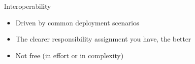 \documentclass[black,white,aspectratio=169]{beamer}
\DeclareRobustCommand{\#}{\adjustbox{valign=B,totalheight=.57\baselineskip}{\oldhash}}%
\newcommand\todo[1]{
    \textcolor{red}{#1}
}
\begin{document}
    \begin{frame}{Interoperability}
        \begin{itemize}
            \item Driven by common deployment scenarios~\medskip
            \item The clearer responsibility assignment you have, the better~\medskip
            \item Not free (in effort or in complexity)~\medskip
        \end{itemize}
    \end{frame}

\end{document}
